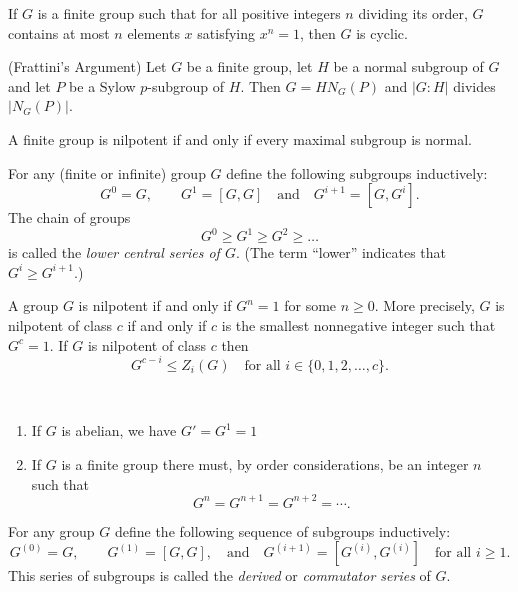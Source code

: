 \documentclass[../main]{subfiles}
\begin{document}
\begin{prop}
 If $G$ is a finite group such that for all positive integers $n$ dividing its order, $G$ contains at most $n$ elements $x$ satisfying $x^n = 1$, then $G$ is cyclic.
\end{prop}


\begin{prop}
 (Frattini's Argument) Let $G$ be a finite group, let $H$ be a normal subgroup of $G$ and let $P$ be a Sylow $p$-subgroup of $H$. Then $G = H N_G(P)$ and $|G : H|$ divides $|N_G(P)|$.
\end{prop}


\begin{prop}
 A finite group is nilpotent if and only if every maximal subgroup is normal. 
\end{prop}


\begin{dfn}
 For any (finite or infinite) group $G$ define the following subgroups inductively:
 \[ G^0 = G, \qquad G^1 = [G,G] \quad \text{and} \quad G^{i+1} = [G,G^i]. \]
 The chain of groups
 \[ G^0 \geq G^1 \geq G^2 \geq \ldots \]
 is called the \textit{lower central series of $G$}. (The term ``lower'' indicates that $G^i \geq G^{i+1}$.)
\end{dfn}


\begin{thm}
 A group $G$ is nilpotent if and only if $G^n = 1$ for some $n \geq 0$. More precisely, $G$ is nilpotent of class $c$ if and only if $c$ is the smallest nonnegative integer such that $G^c = 1$. If $G$ is nilpotent of class $c$ then 
 \[ G^{c-i} \leq Z_i(G) \quad \text{for all } i \in \{0,1,2, \ldots, c\}. \]
\end{thm}


\begin{nt}
 ~\begin{enumerate}
   \item If $G$ is abelian, we have $G' = G^1 = 1$
   
   \item If $G$ is a finite group there must, by order considerations, be an integer $n$ such that 
   \[ G^n = G^{n+1} = G^{n+2} = \cdots. \]
  \end{enumerate}
\end{nt}


\begin{dfn}
 For any group $G$ define the following sequence of subgroups inductively:
 \[ G^{(0)} = G, \qquad G^{(1)} = [G,G], \quad \text{and} \quad G^{(i+1)} = [G^{(i)}, G^{(i)}] \quad \text{for all } i \geq 1. \]
 This series of subgroups is called the \textit{derived} or \textit{commutator series} of $G$. 
\end{dfn}
\end{document}
